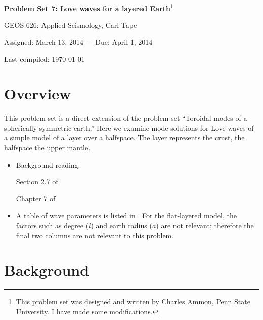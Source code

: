 \documentclass[11pt,titlepage,fleqn]{article}
\begin{document}

\begin{center}
\begin{spacing}{1.2}
{\large \bf Problem Set 7: Love waves for a layered Earth\footnote{This problem set was designed and written by Charles Ammon, Penn State University. I have made some modifications.}}

GEOS 626: Applied Seismology, Carl Tape

Assigned: March 13, 2014 --- Due: April 1, 2014

Last compiled: \today
\end{spacing}
\end{center}


\section*{Overview}

This problem set is a direct extension of the problem set ``Toroidal modes of a spherically symmetric earth.'' Here we examine mode solutions for Love waves of a simple model of a layer over a halfspace. The layer represents the crust, the halfspace the upper mantle.

\begin{itemize}
\item Background reading:

Section 2.7 of \citet{SteinWysession}

Chapter 7 of \citet{AkiRichardsE2}

\item A table of wave parameters is listed in . For the flat-layered model, the factors such as degree ($l$) and earth radius ($a$) are not relevant; therefore the final two columns are not relevant to this problem.

\end{itemize}


\section*{Background}
\end{document}
